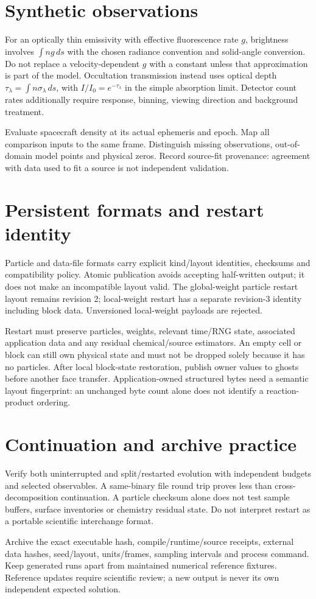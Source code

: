 \section{Synthetic observations}
For an optically thin emissivity with effective fluorescence rate $g$,
brightness involves $\int n g\,ds$ with the chosen radiance convention and
solid-angle conversion. Do not replace a velocity-dependent $g$ with a
constant unless that approximation is part of the model. Occultation
transmission instead uses optical depth
$\tau_\lambda=\int n\sigma_\lambda\,ds$, with $I/I_0=e^{-\tau_\lambda}$
in the simple absorption limit. Detector count rates additionally require
response, binning, viewing direction and background treatment.

Evaluate spacecraft density at its actual ephemeris and epoch. Map all
comparison inputs to the same frame. Distinguish missing observations,
out-of-domain model points and physical zeros. Record source-fit provenance:
agreement with data used to fit a source is not independent validation.

\section{Persistent formats and restart identity}
Particle and data-file formats carry explicit kind/layout identities,
checksums and compatibility policy. Atomic publication avoids accepting
half-written output; it does not make an incompatible layout valid.
The global-weight particle restart layout remains revision 2;
local-weight restart has a separate revision-3 identity including block data.
Unversioned local-weight payloads are rejected.

Restart must preserve particles, weights, relevant time/RNG state, associated
application data and any residual chemical/source estimators. An empty cell
or block can still own physical state and must not be dropped solely because
it has no particles. After local block-state restoration, publish owner
values to ghosts before another face transfer.
Application-owned structured bytes need a semantic layout fingerprint:
an unchanged byte count alone does not identify a reaction-product ordering.

\section{Continuation and archive practice}
Verify both uninterrupted and split/restarted evolution with independent
budgets and selected observables. A same-binary file round trip proves less
than cross-decomposition continuation. A particle checksum alone does not
test sample buffers, surface inventories or chemistry residual state.
Do not interpret restart as a portable scientific interchange format.

Archive the exact executable hash, compile/runtime/source receipts, external
data hashes, seed/layout, units/frames, sampling intervals and process command.
Keep generated runs apart from maintained numerical reference fixtures.
Reference updates require scientific review; a new output is never its own
independent expected solution.
